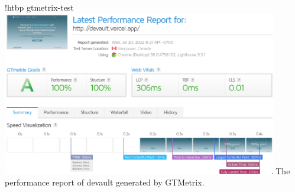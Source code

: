 \namedfigure
{!htbp}
{gtmetrix-test}
{\includegraphics[width=0.9\textwidth]{resources/images/gtmetrix-test.png}}
{The performance report of devault generated by GTMetrix.}
